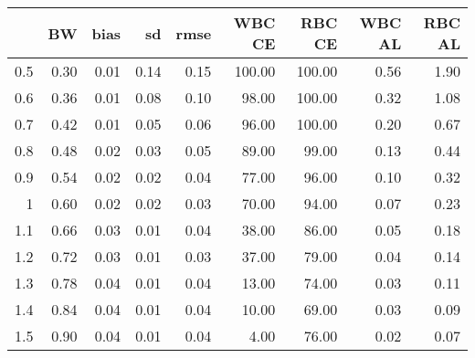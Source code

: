 \begin{table}[ht]
\centering
\begin{tabular}{rrrrrrrrr}
  \hline
 & BW & bias & sd & rmse & WBC CE & RBC CE & WBC AL & RBC AL \\ 
  \hline
0.5 & 0.30 & 0.01 & 0.14 & 0.15 & 100.00 & 100.00 & 0.56 & 1.90 \\ 
  0.6 & 0.36 & 0.01 & 0.08 & 0.10 & 98.00 & 100.00 & 0.32 & 1.08 \\ 
  0.7 & 0.42 & 0.01 & 0.05 & 0.06 & 96.00 & 100.00 & 0.20 & 0.67 \\ 
  0.8 & 0.48 & 0.02 & 0.03 & 0.05 & 89.00 & 99.00 & 0.13 & 0.44 \\ 
  0.9 & 0.54 & 0.02 & 0.02 & 0.04 & 77.00 & 96.00 & 0.10 & 0.32 \\ 
  1 & 0.60 & 0.02 & 0.02 & 0.03 & 70.00 & 94.00 & 0.07 & 0.23 \\ 
  1.1 & 0.66 & 0.03 & 0.01 & 0.04 & 38.00 & 86.00 & 0.05 & 0.18 \\ 
  1.2 & 0.72 & 0.03 & 0.01 & 0.03 & 37.00 & 79.00 & 0.04 & 0.14 \\ 
  1.3 & 0.78 & 0.04 & 0.01 & 0.04 & 13.00 & 74.00 & 0.03 & 0.11 \\ 
  1.4 & 0.84 & 0.04 & 0.01 & 0.04 & 10.00 & 69.00 & 0.03 & 0.09 \\ 
  1.5 & 0.90 & 0.04 & 0.01 & 0.04 & 4.00 & 76.00 & 0.02 & 0.07 \\ 
   \hline
\end{tabular}
\end{table}
